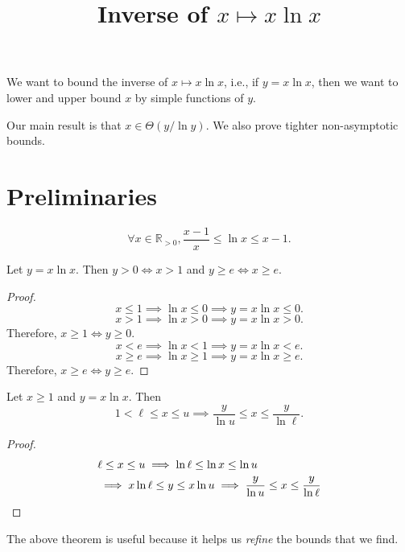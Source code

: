 

\title{Inverse of \texorpdfstring{$x \mapsto x\ln x$}{x -> x*ln(x)}}



\maketitle
\initMinimal{}

We want to bound the inverse of $x \mapsto x\ln x$, i.e.,
if $y = x\ln x$, then we want to lower and upper bound $x$
by simple functions of $y$.

Our main result is that $x \in \Theta(y/\ln y)$.
We also prove tighter non-asymptotic bounds.

\section{Preliminaries}

\begin{lemma}
\label{thm:log-bound}
\[ \forall x \in \mathbb{R}_{> 0}, \frac{x-1}{x} \le \ln x \le x - 1. \]
\end{lemma}

\begin{lemma}
\label{thm:xy-lb}
Let $y = x\ln x$.
Then $y > 0 \iff x > 1$ and $y \ge e \iff x \ge e$.
\end{lemma}
\begin{proof}
\[ x \le 1 \implies \ln x \le 0 \implies y = x\ln x \le 0. \]
\[ x > 1 \implies \ln x > 0 \implies y = x\ln x > 0. \]
Therefore, $x \ge 1 \iff y \ge 0$.
\[ x < e \implies \ln x < 1 \implies y = x\ln x < e. \]
\[ x \ge e \implies \ln x \ge 1 \implies y = x\ln x \ge e. \]
Therefore, $x \ge e \iff y \ge e$.
\end{proof}

\begin{theorem}
\label{thm:refine}
Let $x \ge 1$ and $y = x\ln x$. Then
\[ 1 < \ell \le x \le u \implies \frac{y}{\ln u} \le x \le \frac{y}{\ln\ell}. \]
\end{theorem}
\begin{proof}
\begin{align*}
& \ell \le x \le u
\implies \ln\ell \le \ln x \le \ln u
\\ &\implies x\ln\ell \le y \le x\ln u
\implies \frac{y}{\ln u} \le x \le \frac{y}{\ln\ell}
\qedhere \end{align*}
\end{proof}
The above theorem is useful because it helps us \emph{refine} the bounds that we find.

